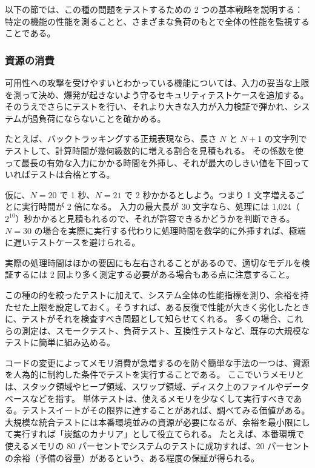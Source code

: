 \documentclass[uplatex]{jsarticle}
\def\label#1{}%
\begin{document}
以下の節では、この種の問題をテストするための 2 つの基本戦略を説明する：特定の機能の性能を測ることと、さまざまな負荷のもとで全体の性能を監視することである。

\subsubsection{資源の消費}

可用性への攻撃を受けやすいとわかっている機能については、入力の妥当な上限を測って決め、爆発が起きないよう守るセキュリティテストケースを追加する。
そのうえでさらにテストを行い、それより大きな入力が入力検証で弾かれ、システムが過負荷にならないことを確かめる。

たとえば、バックトラッキングする正規表現なら、長さ $N$ と $N+1$ の文字列でテストして、計算時間が幾何級数的に増える割合を見積もれる。
その係数を使って最長の有効な入力にかかる時間を外挿し、それが最大のしきい値を下回っていればテストは合格とする。

\begin{exa}[計算時間の外挿]\label{exa:ch12-extrapolate-runtime}
仮に、$N = 20$ で 1 秒、$N = 21$ で 2 秒かかるとしよう。つまり 1 文字増えるごとに実行時間が 2 倍になる。
入力の最大長が 30 文字なら、処理には 1,024（$2^{10}$）秒かかると見積もれるので、それが許容できるかどうかを判断できる。
$N = 30$ の場合を実際に実行する代わりに処理時間を数学的に外挿すれば、極端に遅いテストケースを避けられる。
\end{exa}

\begin{rem}[測定の回数]\label{rem:ch12-more-measurements}
実際の処理時間はほかの要因にも左右されることがあるので、適切なモデルを検証するには 2 回より多く測定する必要がある場合もある点に注意すること。
\end{rem}

この種の的を絞ったテストに加えて、システム全体の性能指標を測り、余裕を持たせた上限を設定しておく。そうすれば、ある反復で性能が大きく劣化したときに、テストがそれを検査すべき問題として知らせてくれる。
多くの場合、これらの測定は、スモークテスト、負荷テスト、互換性テストなど、既存の大規模なテストに簡単に組み込める。

コードの変更によってメモリ消費が急増するのを防ぐ簡単な手法の一つは、資源を人為的に制約した条件でテストを実行することである。
ここでいうメモリとは、スタック領域やヒープ領域、スワップ領域、ディスク上のファイルやデータベースなどを指す。
単体テストは、使えるメモリを少なくして実行すべきである。テストスイートがその限界に達することがあれば、調べてみる価値がある。
大規模な統合テストには本番環境並みの資源が必要になるが、余裕を最小限にして実行すれば「炭鉱のカナリア」として役立てられる。
たとえば、本番環境で使えるメモリの 80 パーセントでシステムのテストに成功すれば、20 パーセントの余裕（予備の容量）があるという、ある程度の保証が得られる。
\end{document}
